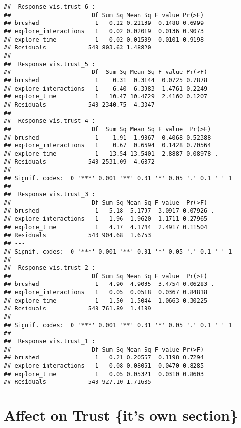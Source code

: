 \documentclass[
]{article}
\begin{document}
\begin{verbatim}
##  Response vis.trust_6 :
##                       Df Sum Sq Mean Sq F value Pr(>F)
## brushed                1   0.22 0.22139  0.1488 0.6999
## explore_interactions   1   0.02 0.02019  0.0136 0.9073
## explore_time           1   0.02 0.01509  0.0101 0.9198
## Residuals            540 803.63 1.48820               
## 
##  Response vis.trust_5 :
##                       Df  Sum Sq Mean Sq F value Pr(>F)
## brushed                1    0.31  0.3144  0.0725 0.7878
## explore_interactions   1    6.40  6.3983  1.4761 0.2249
## explore_time           1   10.47 10.4729  2.4160 0.1207
## Residuals            540 2340.75  4.3347               
## 
##  Response vis.trust_4 :
##                       Df  Sum Sq Mean Sq F value  Pr(>F)  
## brushed                1    1.91  1.9067  0.4068 0.52388  
## explore_interactions   1    0.67  0.6694  0.1428 0.70564  
## explore_time           1   13.54 13.5401  2.8887 0.08978 .
## Residuals            540 2531.09  4.6872                  
## ---
## Signif. codes:  0 '***' 0.001 '**' 0.01 '*' 0.05 '.' 0.1 ' ' 1
## 
##  Response vis.trust_3 :
##                       Df Sum Sq Mean Sq F value  Pr(>F)  
## brushed                1   5.18  5.1797  3.0917 0.07926 .
## explore_interactions   1   1.96  1.9620  1.1711 0.27965  
## explore_time           1   4.17  4.1744  2.4917 0.11504  
## Residuals            540 904.68  1.6753                  
## ---
## Signif. codes:  0 '***' 0.001 '**' 0.01 '*' 0.05 '.' 0.1 ' ' 1
## 
##  Response vis.trust_2 :
##                       Df Sum Sq Mean Sq F value  Pr(>F)  
## brushed                1   4.90  4.9035  3.4754 0.06283 .
## explore_interactions   1   0.05  0.0518  0.0367 0.84818  
## explore_time           1   1.50  1.5044  1.0663 0.30225  
## Residuals            540 761.89  1.4109                  
## ---
## Signif. codes:  0 '***' 0.001 '**' 0.01 '*' 0.05 '.' 0.1 ' ' 1
## 
##  Response vis.trust_1 :
##                       Df Sum Sq Mean Sq F value Pr(>F)
## brushed                1   0.21 0.20567  0.1198 0.7294
## explore_interactions   1   0.08 0.08061  0.0470 0.8285
## explore_time           1   0.05 0.05321  0.0310 0.8603
## Residuals            540 927.10 1.71685
\end{verbatim}

\hypertarget{affect-on-trust-its-own-section}{%
\section{Affect on Trust \{it's own
section\}}\label{affect-on-trust-its-own-section}}
\end{document}
